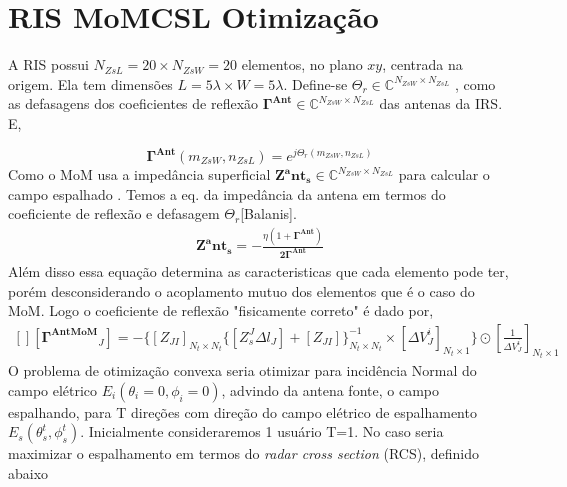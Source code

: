 \documentclass[
	12pt,				%
	openright,			%
	oneside,			%
	a4papey79r,			%
	english,			%
	brazil				%
	]{abntex2}
\begin{document}
\section{RIS MoMCSL Otimização}

 A RIS possui $N_{ZsL}=20 \times N_{ZsW}=20 $ elementos, no plano $xy$, centrada na origem. Ela tem dimensões $L=5\lambda \times W=5 \lambda$.
Define-se $\Theta_r \in \mathbb{C}^{N_{ZsW} \times N_{ZsL}}  $ , como as defasagens dos coeficientes de reflexão $\mathbf{\Gamma^{Ant}} \in \mathbb{C}^{N_{ZsW} \times N_{ZsL}}  $ das antenas da IRS. E,

\begin{equation}
    \mathbf{\Gamma^{Ant}}({m_{ZsW},n_{ZsL}})=e^{j\Theta_r({m_{ZsW},n_{ZsL}})}
\end{equation}
Como o MoM usa a impedância superficial $\mathbf{Z^ant_s} \in \mathbb{C}^{N_{ZsW} \times N_{ZsL}}  $ para calcular o campo espalhado . Temos a eq. da impedância da antena em termos do coeficiente de reflexão e defasagem $\Theta_r$[Balanis].
\begin{equation}
\begin{aligned}
  \mathbf{Z^ant_s} =-\frac{\eta(1+\mathbf{\Gamma^{Ant}})}{\mathbf{2\Gamma^{Ant}}} 
   \end{aligned}
\end{equation}
Além disso essa equação determina as caracteristicas que cada elemento pode ter, porém desconsiderando o acoplamento mutuo dos elementos que é o caso do MoM. Logo o  coeficiente de reflexão "fisicamente correto" é dado por,
\begin{equation}
\begin{aligned}
[][ \mathbf{\Gamma^{AntMoM}}_J  
 ]=-
  \biggl\{[Z_{JI}]_{N_t \times N_t} \{ [Z_{s}^J\Delta l_J]+[Z_{JI}]\}^{-1}_{N_t \times N_t} \times[\Delta V^i_J]_{N_t \times 1} \biggl\} \odot{[\frac{1}{\Delta V_J^i}]_{N_t \times 1}}
   \end{aligned}
\end{equation}
O problema de otimização convexa seria otimizar para incidência Normal do campo elétrico $E_i(\theta_i=0,\phi_i=0)$,  advindo da antena fonte,  o campo espalhando, para T direções com direção do campo elétrico de espalhamento $E_s(\theta_s^t,\phi_s^t)$. Inicialmente consideraremos 1 usuário T=1. No caso seria maximizar o espalhamento em termos do  \emph{radar cross section } (RCS), definido abaixo
\end{document}
